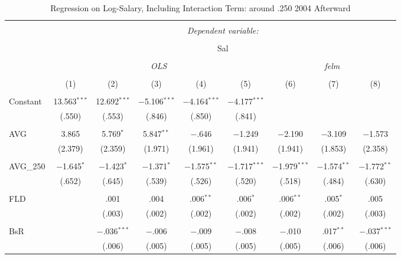 
\begin{table}[H] \centering
  \caption{Regression on Log-Salary, Including Interaction Term: around .250 2004 Afterward} 
  \label{AVG250_D}
\tiny
\begin{tabular}{@{\extracolsep{5pt}}lcccccccc}
\\[-1.8ex]\hline
\hline \\[-1.8ex]
 & \multicolumn{8}{c}{\textit{Dependent variable:}} \\
\cline{2-9}
\\[-1.8ex] & \multicolumn{8}{c}{Sal} \\
\\[-1.8ex] & \multicolumn{5}{c}{\textit{OLS}} & \multicolumn{3}{c}{\textit{felm}} \\
\\[-1.8ex] & (1) & (2) & (3) & (4) & (5) & (6) & (7) & (8)\\
\hline \\[-1.8ex]
 Constant & 13.563$^{***}$ & 12.692$^{***}$ & $-$5.106$^{***}$ & $-$4.164$^{***}$ & $-$4.177$^{***}$ &  &  &  \\
  & (.550) & (.553) & (.846) & (.850) & (.841) &  &  &  \\
  & & & & & & & & \\
 AVG & 3.865 & 5.769$^{*}$ & 5.847$^{**}$ & $-$.646 & $-$1.249 & $-$2.190 & $-$3.109 & $-$1.573 \\
  & (2.379) & (2.359) & (1.971) & (1.961) & (1.941) & (1.941) & (1.853) & (2.358) \\
  & & & & & & & & \\
 AVG\_250 & $-$1.645$^{*}$ & $-$1.423$^{*}$ & $-$1.371$^{*}$ & $-$1.575$^{**}$ & $-$1.717$^{***}$ & $-$1.979$^{***}$ & $-$1.574$^{**}$ & $-$1.772$^{**}$ \\
  & (.652) & (.645) & (.539) & (.526) & (.520) & (.518) & (.484) & (.630) \\
  & & & & & & & & \\
 FLD &  & .001 & .004 & .006$^{**}$ & .006$^{*}$ & .006$^{**}$ & .005$^{*}$ & .005 \\
  &  & (.003) & (.002) & (.002) & (.002) & (.002) & (.002) & (.003) \\
  & & & & & & & & \\
 BsR &  & $-$.036$^{***}$ & $-$.006 & $-$.009 & $-$.008 & $-$.010 & .017$^{**}$ & $-$.037$^{***}$ \\
  &  & (.006) & (.005) & (.005) & (.005) & (.005) & (.006) & (.006) \\

\end{tabular}
\end{table}
